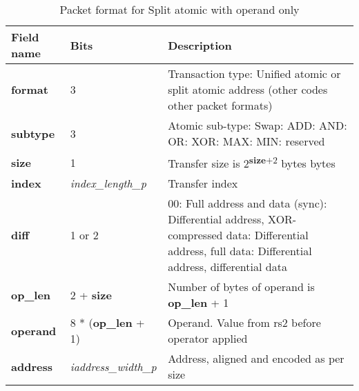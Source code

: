 \begin{table}[htp]
  \centering
  \caption{Packet format for Split atomic with operand only}
  \label{tab:te_datadx0y8}
  \begin{tabulary}{\textwidth}{|l|p{40mm}|p{90mm}|}
    \hline
    {\bf Field name} & {\bf Bits} & {\bf Description} \\
    \hline
    \textbf{format} & 	3	& Transaction type: Unified atomic or split atomic address\newline	
		(other codes other packet formats)\\
    \hline
    \textbf{subtype} & 	3	& Atomic sub-type: Swap: ADD: AND: OR: XOR: MAX: MIN: reserved\\	
    \hline
    \textbf{size} & 1 & Transfer size is 2\textsuperscript{\textbf{size}+2} bytes bytes\\
    \hline
    \textbf{index} & \textit{index\_length\_p} & Transfer index\\
    \textbf{diff} & 1 or 2 & 00: Full address and data (sync):  Differential address, XOR-compressed data: Differential address, full data: Differential address, differential data\\
    \hline
    \textbf{op\_len} & 2 + \textbf{size} &	Number of bytes of operand is \textbf{op\_len} + 1\\
    \hline
    \textbf{operand}	& 8 * (\textbf{op\_len} + 1) & Operand.  Value from rs2 before operator applied\\
    \hline
    \textbf{address} &  \textit{iaddress\_width\_p} &Address, aligned and encoded as per size \\
    \hline
  \end{tabulary}
\end{table}

